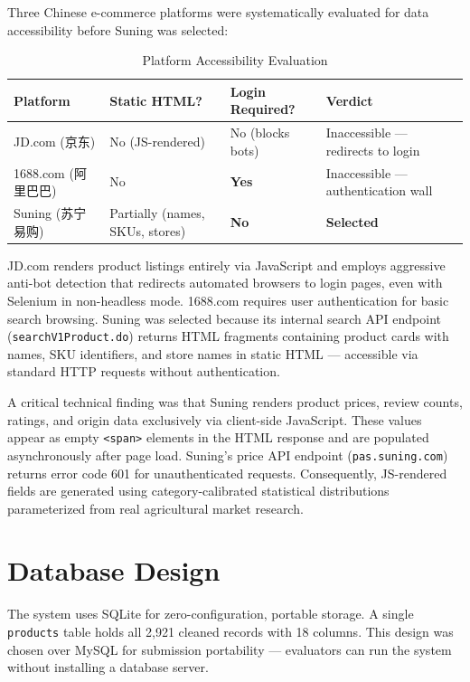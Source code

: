 \documentclass[12pt,a4paper]{report}
\begin{document}
Three Chinese e-commerce platforms were systematically evaluated for data accessibility before Suning was selected:

\begin{table}[H]
  \centering
  \caption{Platform Accessibility Evaluation}
  \begin{tabular}{@{}p{2.8cm} p{3cm} p{3cm} p{4.5cm}@{}}
    \toprule
    \textbf{Platform} & \textbf{Static HTML?} & \textbf{Login Required?} & \textbf{Verdict} \\
    \midrule
    JD.com (京东)   & No (JS-rendered) & No (blocks bots) & Inaccessible --- redirects to login \\
    1688.com (阿里巴巴) & No & \textbf{Yes} & Inaccessible --- authentication wall \\
    Suning (苏宁易购) & Partially (names, SKUs, stores) & \textbf{No} & \textbf{Selected} \\
    \bottomrule
  \end{tabular}
\end{table}

JD.com renders product listings entirely via JavaScript and employs aggressive anti-bot detection that redirects automated browsers to login pages, even with Selenium in non-headless mode. 1688.com requires user authentication for basic search browsing. Suning was selected because its internal search API endpoint (\texttt{searchV1Product.do}) returns HTML fragments containing product cards with names, SKU identifiers, and store names in static HTML --- accessible via standard HTTP requests without authentication.

A critical technical finding was that Suning renders product prices, review counts, ratings, and origin data exclusively via client-side JavaScript. These values appear as empty \texttt{<span>} elements in the HTML response and are populated asynchronously after page load. Suning's price API endpoint (\texttt{pas.suning.com}) returns error code 601 for unauthenticated requests. Consequently, JS-rendered fields are generated using category-calibrated statistical distributions parameterized from real agricultural market research.

\section{Database Design}

The system uses SQLite for zero-configuration, portable storage. A single \texttt{products} table holds all 2,921 cleaned records with 18 columns. This design was chosen over MySQL for submission portability --- evaluators can run the system without installing a database server.
\end{document}
